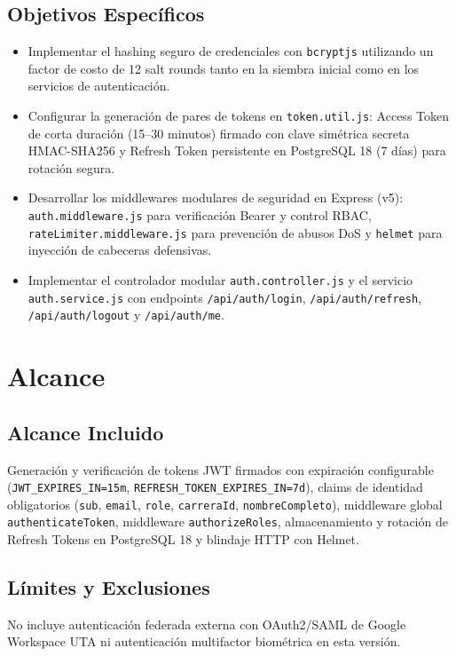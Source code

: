 \documentclass[12pt,a4paper]{article}
\begin{document}
\subsection{Objetivos Específicos}
\begin{itemize}[leftmargin=1.5em, itemsep=1.5pt, topsep=1.5pt]
    \item Implementar el hashing seguro de credenciales con \texttt{bcryptjs} utilizando un factor de costo de 12 salt rounds tanto en la siembra inicial como en los servicios de autenticación.
    \item Configurar la generación de pares de tokens en \texttt{token.util.js}: Access Token de corta duración (15--30 minutos) firmado con clave simétrica secreta HMAC-SHA256 y Refresh Token persistente en PostgreSQL 18 (7 días) para rotación segura.
    \item Desarrollar los middlewares modulares de seguridad en Express (v5): \texttt{auth.middleware.js} para verificación Bearer y control RBAC, \texttt{rateLimiter.middleware.js} para prevención de abusos DoS y \texttt{helmet} para inyección de cabeceras defensivas.
    \item Implementar el controlador modular \texttt{auth.controller.js} y el servicio \texttt{auth.service.js} con endpoints \texttt{/api/auth/login}, \texttt{/api/auth/refresh}, \texttt{/api/auth/logout} y \texttt{/api/auth/me}.
\end{itemize}

\section{Alcance}

\subsection{Alcance Incluido}
Generación y verificación de tokens JWT firmados con expiración configurable (\texttt{JWT\_EXPIRES\_IN=15m}, \texttt{REFRESH\_TOKEN\_EXPIRES\_IN=7d}), claims de identidad obligatorios (\texttt{sub}, \texttt{email}, \texttt{role}, \texttt{carreraId}, \texttt{nombreCompleto}), middleware global \texttt{authenticateToken}, middleware \texttt{authorizeRoles}, almacenamiento y rotación de Refresh Tokens en PostgreSQL 18 y blindaje HTTP con Helmet.

\subsection{Límites y Exclusiones}
No incluye autenticación federada externa con OAuth2/SAML de Google Workspace UTA ni autenticación multifactor biométrica en esta versión.
\end{document}
